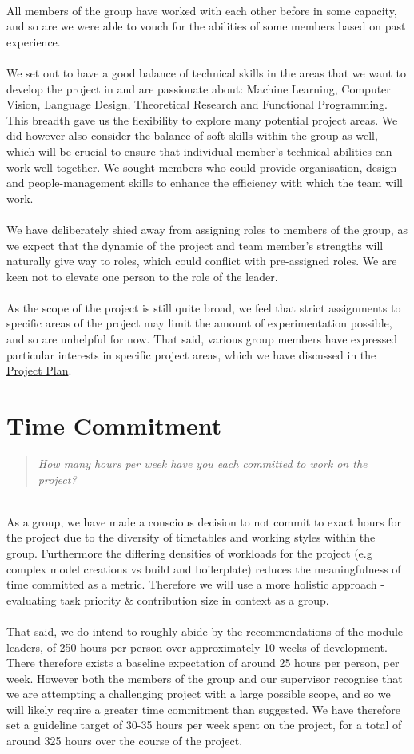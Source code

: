 \documentclass{report}
\newcommand{\teamq}[1]{\begin{quote}
    \large\textit{#1}
\end{quote}}
\begin{document}
\vspace*{0.5cm}
\\
\noindent All members of the group have worked with each other before in some capacity, and so are we were able to vouch for the abilities of some members based on past experience.
\\
\\
We set out to have a good balance of technical skills in the areas that we want to develop the project in and are passionate about: Machine Learning, Computer Vision, Language Design, Theoretical Research and Functional Programming. This breadth gave us the flexibility to explore many potential project areas. We did however also consider the balance of soft skills within the group as well, which will be crucial to ensure that individual member's technical abilities can work well together. We sought members who could provide organisation, design and people-management skills to enhance the efficiency with which the team will work.
\\
\\
We have deliberately shied away from assigning roles to members of the group, as we expect that the dynamic of the project and team member's strengths will naturally give way to roles, which could conflict with pre-assigned roles. We are keen not to elevate one person to the role of the leader.\\
\\
As the scope of the project is still quite broad, we feel that strict assignments to specific areas of the project may limit the amount of experimentation possible, and so are unhelpful for now. That said, various group members have expressed particular interests in specific project areas, which we have discussed in the \hyperref[sec:projplan]{Project Plan}.

\section*{Time Commitment}
\teamq{How many hours per week have you each committed to work on the project?}
\\
As a group, we have made a conscious decision to not commit to exact hours for the project due to the diversity of timetables and working styles within the group. Furthermore the differing densities of workloads for the project (e.g complex model creations vs build and boilerplate) reduces the meaningfulness of time committed as a metric. Therefore we will use a more holistic approach - evaluating task priority \& contribution size in context as a group.
\\\\
That said, we do intend to roughly abide by the recommendations of the module leaders, of 250 hours per person over approximately 10 weeks of development. There therefore exists a baseline expectation of around 25 hours per person, per week. However both the members of the group and our supervisor recognise that we are attempting a challenging project with a large possible scope, and so we will likely require a greater time commitment than suggested. We have therefore set a guideline target of 30-35 hours per week spent on the project, for a total of around 325 hours over the course of the project.
\end{document}
